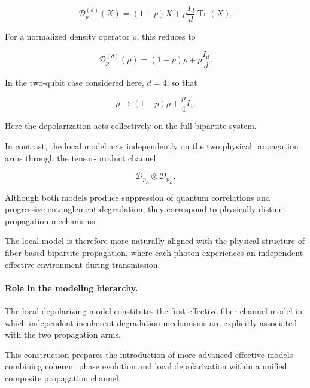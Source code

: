 \begin{equation}
\mathcal{D}_{p}^{(d)}(X)
=
(1-p)X
+
p\frac{I_d}{d}
\operatorname{Tr}(X).
\label{eq:global_depolarizing_operator_map_d}
\end{equation}

For a normalized density operator \( \rho \), this reduces to

\begin{equation}
\mathcal{D}_{p}^{(d)}(\rho)
=
(1-p)\rho
+
p\frac{I_d}{d}.
\label{eq:global_depolarizing_density_map_d}
\end{equation}

In the two-qubit case considered here, \( d=4 \), so that

\begin{equation}
\rho
\rightarrow
(1-p)\rho
+
\frac{p}{4}I_4.
\label{eq:global_depolarization_reminder}
\end{equation}

Here the depolarization acts collectively on the full bipartite system.

\medskip

In contrast, the local model acts independently on the two physical propagation arms through the tensor-product channel

\[
\mathcal{D}_{p_A}
\otimes
\mathcal{D}_{p_B}.
\]

Although both models produce suppression of quantum correlations and progressive entanglement degradation, they correspond to physically distinct propagation mechanisms.

\medskip

The local model is therefore more naturally aligned with the physical structure of fiber-based bipartite propagation, where each photon experiences an independent effective environment during transmission.

\medskip

\paragraph{Role in the modeling hierarchy.}

The local depolarizing model constitutes the first effective fiber-channel model in which independent incoherent degradation mechanisms are explicitly associated with the two propagation arms.

\medskip

This construction prepares the introduction of more advanced effective models combining coherent phase evolution and local depolarization within a unified composite propagation channel.

